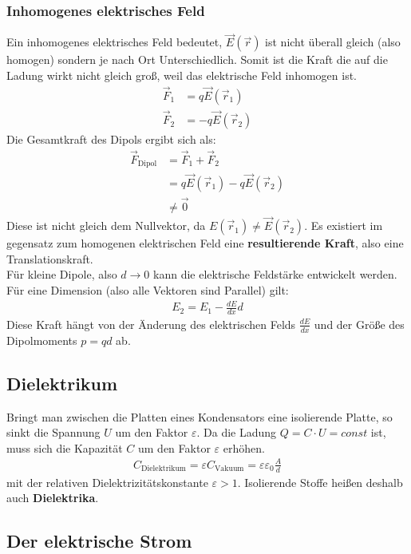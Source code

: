\documentclass{article}
\begin{document}
\subsubsection{Inhomogenes elektrisches Feld}
Ein inhomogenes elektrisches Feld bedeutet, $\vec{E}(\vec{r})$ ist nicht überall gleich (also homogen) sondern je nach Ort Unterschiedlich.
Somit ist die Kraft die auf die Ladung wirkt nicht gleich groß, weil das elektrische Feld inhomogen ist.
\begin{align}
    \vec{F}_1&=q\vec{E}(\vec{r}_1)\\
    \vec{F}_2&=-q\vec{E}(\vec{r}_2)
\end{align}
Die Gesamtkraft des Dipols ergibt sich als:
\begin{align}
    \vec{F}_\mathrm{Dipol}&=\vec{F}_1+\vec{F}_2\\
    &=q\vec{E}(\vec{r}_1)-q\vec{E}(\vec{r}_2)\\
    &\not=\vec{0}
\end{align}
Diese ist nicht gleich dem Nullvektor, da $E(\vec{r}_1)\not=\vec{E}(\vec{r}_2)$.
Es existiert im gegensatz zum homogenen elektrischen Feld eine \textbf{resultierende Kraft}, also eine Translationskraft.\\

\noindent Für kleine Dipole, also $d\to 0$ kann die elektrische Feldstärke entwickelt werden. 
Für eine Dimension (also alle Vektoren sind Parallel) gilt:
\begin{align}
    E_2=E_1-\frac{dE}{dx}d
\end{align}
Diese Kraft hängt von der Änderung des elektrischen Felds $\frac{dE}{dx}$ und der Größe des Dipolmoments $p=qd$ ab.

\subsection{Dielektrikum}
Bringt man zwischen die Platten eines Kondensators eine isolierende Platte, so sinkt die Spannung $U$ um den Faktor $\varepsilon$.
Da die Ladung $Q=C\cdot U=const$ ist, muss sich die Kapazität $C$ um den Faktor $\varepsilon$ erhöhen.
\begin{align}
    C_\mathrm{Dielektrikum}=\varepsilon C_\mathrm{Vakuum}=\varepsilon\varepsilon_0\frac{A}{d}
\end{align}
mit der relativen Dielektrizitätskonstante $\varepsilon>1$.
Isolierende Stoffe heißen deshalb auch \textbf{Dielektrika}.


\subsection{Der elektrische Strom}
\end{document}
